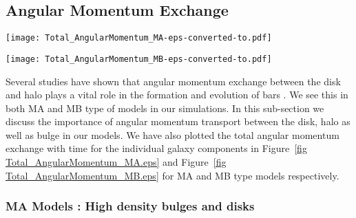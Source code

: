\documentclass[a4paper,fleqn,usenatbib,useAMS]{mnras}
\begin{document}
\subsection{Angular Momentum Exchange}

\begin{figure*}
\texttt{[image: Total\_AngularMomentum\_MA-eps-converted-to.pdf]}
\caption{Total Angular Momentum for all the components(Bulge, Disk and Halo) of all MA models}
\label{fig Total_AngularMomentum_MA.eps}
\end{figure*}

\begin{figure*}
\texttt{[image: Total\_AngularMomentum\_MB-eps-converted-to.pdf]}
\caption{Total Angular Momentum for all the components(Bulge, Disk and Halo) of all MB models}
\label{fig Total_AngularMomentum_MB.eps}
\end{figure*}

Several studies have shown that angular momentum exchange between the disk and halo plays a vital role in the formation and evolution of bars \citep{15a1,15a,Martinez.2006,17,18}.
We see this in both MA and MB type of models in our simulations. In this sub-section we discuss the importance of angular momentum transport between the disk, halo as well as bulge in our models. We have also plotted the total angular momentum exchange with time for the individual galaxy components in Figure~\ref{fig Total_AngularMomentum_MA.eps} and Figure~\ref{fig Total_AngularMomentum_MB.eps} for MA and MB type models respectively.  
 
\subsubsection{MA Models : High density bulges and disks} 
\end{document}
